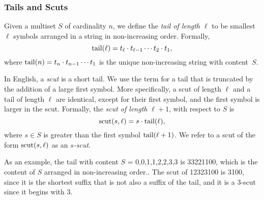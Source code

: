 \subsubsection{Tails and Scuts}
\label{sec:proof_scuts}

Given a multiset $S$ of cardinality $n$, we define the \emph{tail of length $\ell$} to be smallest $\ell$ symbols arranged in a string in non-increasing order.
Formally,
\begin{equation}
    \operatorname{tail}(\ell) = t_{\ell} \cdot t_{\ell-1} \cdots t_2 \cdot t_1,
\end{equation}
where $\operatorname{tail}(n) = t_n \cdot t_{n-1} \cdots t_1$ is the unique non-increasing string with content~$S$.  

In English, a \emph{scut} is a short tail.
We use the term for a tail that is truncated by the addition of a large first symbol.
More specifically, a scut of length $\ell$ and a tail of length $\ell$ are identical, except for their first symbol, and the first symbol is larger in the scut. %
Formally, the \emph{scut of length $\ell+1$}, with respect to $S$ is
\begin{equation}
    \operatorname{scut}(s, \ell) = s \cdot \operatorname{tail}(\ell),
\end{equation}
where $s \in S$ is greater than the first symbol $\operatorname{tail}(\ell+1)$.
We refer to a scut of the form $\operatorname{scut}(s, \ell)$ as an \emph{$s$-scut}.

As an example, the tail with content $S$ = {0,0,1,1,2,2,3,3} is 33221100, which is the content of $S$ arranged in non-increasing order..  The scut of 12323100 is 3100, since it is the shortest suffix that is not also a suffix of the tail, and it is a 3-scut since it begins with 3.

